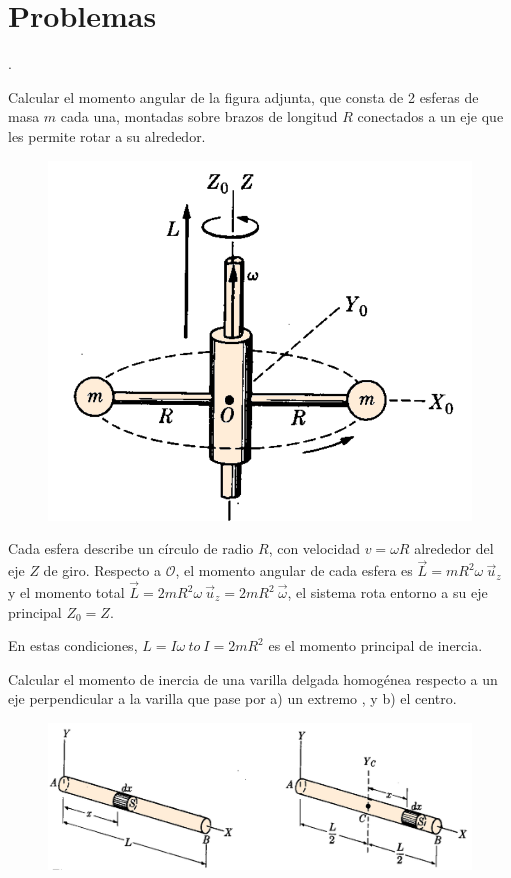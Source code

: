 \section{Problemas}
\begin{prob}

\begin{multicols}{2}.

Calcular el momento angular de la figura adjunta, que consta de 2 esferas de masa $m$ cada una, montadas sobre brazos de longitud $R$ conectados a un eje que les permite rotar a su alrededor. 	
\begin{figure}[H]
	\centering
	\includegraphics[width=.5\textwidth]{imagenes/imagenes16/T16IM08.png}
\end{figure}
\end{multicols}	
\end{prob}

Cada esfera describe un círculo de radio $R$, con velocidad $v=\omega R$ alrededor del eje $Z$ de giro. Respecto a $\mathcal O$, el momento angular de cada esfera es $\vec L=mR^2\omega \ \vec u_z$ y el momento total $\vec L=2mR^2\omega \ \vec u_z=2mR^2 \ \vec \omega$, el sistema rota entorno a su eje principal $Z_0=Z$.

En estas condiciones, $L=I\omega \ to \ I=2mR^2$ es el momento principal de inercia.


\begin{prob}
Calcular el momento de inercia de una varilla delgada homogénea respecto a un eje perpendicular a la varilla que pase por  a)  un extremo	, y b) el centro.
\end{prob}
\begin{figure}[H]
	\centering
	\includegraphics[width=1\textwidth]{imagenes/imagenes16/T16IM09.png}
\end{figure}


